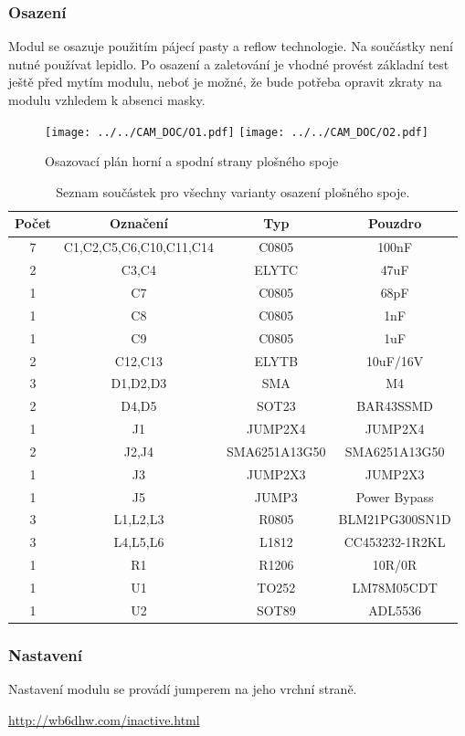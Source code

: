 \documentclass[12pt,a4paper,oneside]{article}
\begin{document}
\subsubsection{Osazení}

Modul se osazuje použitím pájecí pasty a reflow technologie. Na součástky není nutné používat lepidlo.  Po osazení a zaletování je vhodné provést základní test ještě před mytím modulu, neboť je možné, že bude potřeba opravit zkraty na modulu vzhledem k absenci masky. 

\newpage


\begin{figure} [h!tbp]
  \centering
  \texttt{[image: ../../CAM\_DOC/O1.pdf]}
  \texttt{[image: ../../CAM\_DOC/O2.pdf]}
  \caption{Osazovací plán horní a spodní strany plošného spoje}
  \label{fig:osazovaci_plan}
\end{figure}

\begin{savenotes}
\begin{table}[h!]
\begin{center}
\begin{tabular}{ |c|c|c|c| }
\hline 
Počet & Označení & Typ  & Pouzdro  \\ 
\hline 
7	&	C1,C2,C5,C6,C10,C11,C14	&	C0805	&	100nF	\\
2	&	C3,C4	&	ELYTC	&	47uF	\\
1	&	C7	&	C0805	&	68pF	\\
1	&	C8	&	C0805	&	1nF	\\
1	&	C9	&	C0805	&	1uF	\\
2	&	C12,C13	&	ELYTB	&	10uF/16V	\\
3	&	D1,D2,D3	&	SMA	&	M4	\\
2	&	D4,D5	&	SOT23	&	BAR43SSMD	\\
1	&	J1	&	JUMP2X4	&	JUMP2X4	\\
2	&	J2,J4	&	SMA6251A13G50	&	SMA6251A13G50	\\
1	&	J3	&	JUMP2X3	&	JUMP2X3	\\
1	&	J5	&	JUMP3	&	Power Bypass	\\
3	&	L1,L2,L3	&	R0805	&	BLM21PG300SN1D	\\
3	&	L4,L5,L6	&	L1812	&	CC453232-1R2KL	\\
1	&	R1	&	R1206	&	10R/0R	\\
1	&	U1	&	TO252	&	LM78M05CDT	\\
1	&	U2	&	SOT89	&	ADL5536	\\
\hline 
\end{tabular}
\end{center}
\caption{Seznam součástek pro všechny varianty osazení plošného spoje.}
\label{seznam_soucastek}
\end{table}
\end{savenotes}

\newpage

\subsubsection{Nastavení}
Nastavení modulu se provádí jumperem na jeho vrchní straně. 


\begin{thebibliography}{99}
\href{http://wb6dhw.com/inactive.html}{http://wb6dhw.com/inactive.html}

\end{thebibliography}
\end{document}
